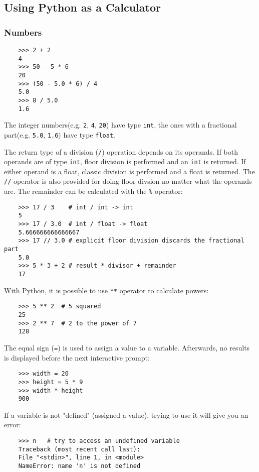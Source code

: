 \documentclass[UTF8]{article}
\begin{document}
\subsection{Using Python as a Calculator}
\subsubsection{Numbers}
\begin{verbatim}
    >>> 2 + 2
    4
    >>> 50 - 5 * 6
    20
    >>> (50 - 5.0 * 6) / 4
    5.0
    >>> 8 / 5.0
    1.6
\end{verbatim}

The integer numbers(e.g. \texttt{2}, \texttt{4}, \texttt{20}) have type \texttt{int}, the ones with
a fractional part(e.g. \texttt{5.0}, \texttt{1.6}) have type \texttt{float}.

The return type of a division (\texttt{/}) operation depends on its operands. If both operands are
of type \texttt{int}, floor division is performed and an \texttt{int} is returned. If either
operand is a float, classic division is performed and a float is returned. The \texttt{//} operator
is also provided for doing floor divsion no matter what the operands are. The remainder can be
calculated with the \texttt{\%} operator:
\begin{verbatim}
    >>> 17 / 3    # int / int -> int
    5
    >>> 17 / 3.0  # int / float -> float
    5.666666666666667
    >>> 17 // 3.0 # explicit floor division discards the fractional part
    5.0
    >>> 5 * 3 + 2 # result * divisor + remainder
    17
\end{verbatim}

With Python, it is possible to use \texttt{**} operator to calculate powers:
\begin{verbatim}
    >>> 5 ** 2  # 5 squared
    25
    >>> 2 ** 7  # 2 to the power of 7
    128
\end{verbatim}

The equal sign (\texttt{=}) is used to assign a value to a variable. Afterwards, no results is
displayed before the next interactive prompt:
\begin{verbatim}
    >>> width = 20
    >>> height = 5 * 9
    >>> width * height
    900
\end{verbatim}

If a variable is not "defined" (assigned a value), trying to use it will give you an error:
\begin{verbatim}
    >>> n   # try to access an undefined variable
    Traceback (most recent call last):
    File "<stdin>", line 1, in <module>
    NameError: name 'n' is not defined
\end{verbatim}
\end{document}
